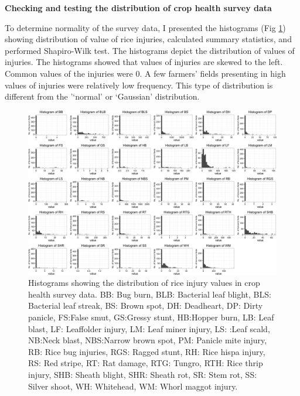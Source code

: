 \textbf{Checking and testing the distribution of crop health survey data}

To determine normality of the survey data, I presented the histograms (Fig \ref{fig:allhisto}) showing distribution of value of rice injuries, calculated summary statistics, and performed Shapiro-Wilk test. The histograms depict the distribution of values of injuries. The histograms showed that values of injuries are skewed to the left. Common values of the injuries were 0. A few farmers’ fields presenting in high values of injuries were relatively low frequency. This type of distribution is different from the '`normal' or `Gaussian' distribution.  

\begin{landscape}
\begin{figure}[!htbp]
\centering
\includegraphics[height = 1\textheight]{figures/allhisto2/allhisto2.png}
\caption[Histograms showing the distribution of rice injury values in crop health survey data.]{Histograms showing the distribution of rice injury values in crop health survey data. BB: Bug burn, BLB: Bacterial leaf blight, BLS: Bacterial leaf streak, BS: Brown spot, DH: Deadheart, DP: Dirty panicle, FS:False smut, GS:Gressy stunt, HB:Hopper burn, LB: Leaf blast, LF: Leaffolder injury, LM: Leaf miner injury, LS: :Leaf scald, NB:Neck blast, NBS:Narrow brown spot, PM: Panicle mite injury, RB: Rice bug injuries, RGS: Ragged stunt, RH: Rice hispa injury, RS: Red stripe, RT: Rat damage, RTG: Tungro, RTH: Rice thrip injury, SHB: Sheath blight, SHR: Sheath rot, SR: Stem rot, SS: Silver shoot, WH: Whitehead, WM: Whorl maggot injury.}
\label{fig:allhisto}
\end{figure}
\end{landscape}

